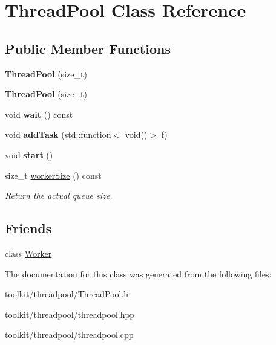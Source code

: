 \hypertarget{classThreadPool}{
\section{ThreadPool Class Reference}
\label{classThreadPool}
}
\subsection*{Public Member Functions}
\begin{DoxyCompactItemize}
\item 
\hypertarget{classThreadPool_ac291710e33dbbed96ee20711080d506d}{
{\bfseries ThreadPool} (size\_\-t)}
\label{classThreadPool_ac291710e33dbbed96ee20711080d506d}

\item 
\hypertarget{classThreadPool_ac291710e33dbbed96ee20711080d506d}{
{\bfseries ThreadPool} (size\_\-t)}
\label{classThreadPool_ac291710e33dbbed96ee20711080d506d}

\item 
\hypertarget{classThreadPool_a55cbf8340d97adab7a2d625c63aec316}{
void {\bfseries wait} () const }
\label{classThreadPool_a55cbf8340d97adab7a2d625c63aec316}

\item 
\hypertarget{classThreadPool_a2e9207443f99bdbebf0f4dd51e8efd69}{
void {\bfseries addTask} (std::function$<$ void()$>$ f)}
\label{classThreadPool_a2e9207443f99bdbebf0f4dd51e8efd69}

\item 
\hypertarget{classThreadPool_a74e85ff1e6605531acdd8e0e3cf903df}{
void {\bfseries start} ()}
\label{classThreadPool_a74e85ff1e6605531acdd8e0e3cf903df}

\item 
\hypertarget{classThreadPool_a4276426c5f9a821f418b32a050976e0c}{
size\_\-t \hyperlink{classThreadPool_a4276426c5f9a821f418b32a050976e0c}{workerSize} () const }
\label{classThreadPool_a4276426c5f9a821f418b32a050976e0c}

\begin{DoxyCompactList}\small\item\em Return the actual queue size. \item\end{DoxyCompactList}\end{DoxyCompactItemize}
\subsection*{Friends}
\begin{DoxyCompactItemize}
\item 
\hypertarget{classThreadPool_a9de4a9533dff2ecc0919852d4c05a67b}{
class \hyperlink{classThreadPool_a9de4a9533dff2ecc0919852d4c05a67b}{Worker}}
\label{classThreadPool_a9de4a9533dff2ecc0919852d4c05a67b}

\end{DoxyCompactItemize}


The documentation for this class was generated from the following files:\begin{DoxyCompactItemize}
\item 
toolkit/threadpool/ThreadPool.h\item 
toolkit/threadpool/threadpool.hpp\item 
toolkit/threadpool/threadpool.cpp\end{DoxyCompactItemize}
